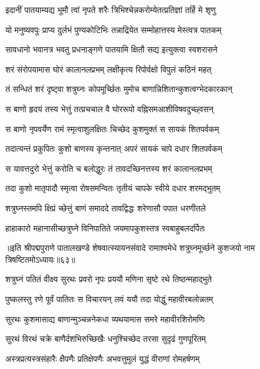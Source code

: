 \twolineshloka
{इदानीं पातयाम्यद्य भूमौ त्वां नृपते शरैः}
{त्रिभिश्चेन्नकरोम्येतत्प्रतिज्ञां तर्हि मे शृणु}%

\twolineshloka
{यो मनुष्यवपुः प्राप्य दुर्लभं पुण्यकोटिभिः}
{तन्नाद्रियेत सम्मोहात्तस्य मेस्त्वत्र पातकम्}%

\twolineshloka
{सावधानो भवानत्र भवतु प्रधनाङ्गणे}
{पातयामि क्षितौ सद्य इत्युक्त्वा स्वशरासने}%

\twolineshloka
{शरं संरोपयामास घोरं कालानलप्रभम्}
{लक्षीकृत्य रिपोर्वक्षो विपुलं कठिनं महत्}%

\twolineshloka
{तं सन्धितं शरं दृष्ट्वा शत्रुघ्नः कोपमूर्च्छितः}
{मुमोच बाणान्निशितान्कुशत्वग्भेदकारकान्}%

\twolineshloka
{स बाणो हृदयं तस्य भेत्तुं तत्प्रचचाल वै}
{घोररूपो वह्निसमआशीविषवदुच्छ्वसन्}%

\twolineshloka
{स बाणो नृपवर्येण रामं स्मृत्वाशुलक्षितः}
{चिच्छेद कुशमुक्तं स सायकं शितपर्वकम्}%

\twolineshloka
{तदात्यन्तं प्रकुपितः कुशो बाणस्य कृन्तनात्}
{अपरं सायकं चापे दधार शितपर्वकम्}%

\twolineshloka
{स यावत्तदुरो भेत्तुं करोति च बलोद्धुरः}
{तं तावदच्छिनत्तस्य शरं कालानलप्रभम्}%

\twolineshloka
{तदा कुशो मातृपादौ स्मृत्वा रोषसमन्वितः}
{तृतीयं चापके स्वीये दधार शरमद्भुतम्}%

\twolineshloka
{शत्रुघ्नस्तमपि क्षिप्रं च्छेत्तुं बाणं समाददे}
{तावद्विद्धः शरेणासौ पपात धरणीतले}%

\twolineshloka
{हाहाकारो महानासीच्छत्रुघ्ने विनिपातिते}
{जयमापकुशस्तत्र स्वबाहुबलदर्पितः}%

{॥इति श्रीपद्मपुराणे पातालखण्डे शेषवात्स्यायनसंवादे रामाश्वमेधे शत्रुघ्नमूर्च्छने कुशजयो नाम त्रिषष्टितमोऽध्यायः॥६३॥}



\twolineshloka
{शत्रुघ्नं पतितं वीक्ष्य सुरथः प्रवरो नृपः}
{प्रययौ मणिना सृष्टे रथे तिष्ठन्महाद्भुते}%

\twolineshloka
{पुष्कलस्तु रणे पूर्वं पातितः स विचारयन्}
{लवं ययौ तदा योद्धुं महावीरबलोन्नतम्}%

\twolineshloka
{सुरथः कुशमासाद्य बाणान्मुञ्चन्ननेकधा}
{व्यथयामास समरे महावीरशिरोमणिः}%

\twolineshloka
{सुरथं विरथं चक्रे बाणैर्दशभिरुच्छिखैः}
{धनुश्चिच्छेद तरसा सुदृढं गुणपूरितम्}%

\twolineshloka
{अस्त्रप्रत्यस्त्रसंहारैः क्षैपणैः प्रतिक्षेपणैः}
{अभवत्तुमुलं युद्धं वीराणां रोमहर्षणम्}%

